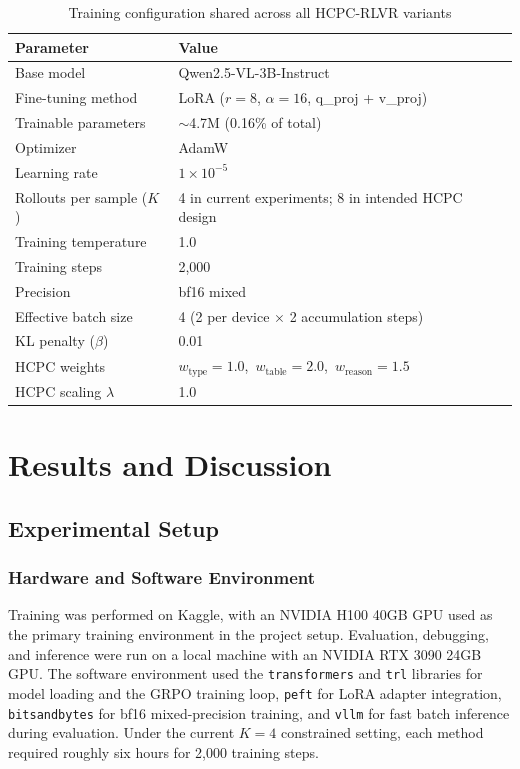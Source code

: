 \documentclass{iutbscthesis}
\begin{document}
\begin{table}[H]
    \centering
    \begin{tabular}{ll}
        \toprule
        Parameter & Value \\
        \midrule
        Base model & Qwen2.5-VL-3B-Instruct \\
        Fine-tuning method & LoRA ($r=8$, $\alpha=16$, q\_proj + v\_proj) \\
        Trainable parameters & $\sim$4.7M (0.16\% of total) \\
        Optimizer & AdamW \\
        Learning rate & $1 \times 10^{-5}$ \\
        Rollouts per sample ($K$) & 4 in current experiments; 8 in intended HCPC design \\
        Training temperature & 1.0 \\
        Training steps & 2,000 \\
        Precision & bf16 mixed \\
        Effective batch size & 4 (2 per device $\times$ 2 accumulation steps) \\
        KL penalty ($\beta$) & 0.01 \\
        HCPC weights & $w_{\text{type}}=1.0$,\ $w_{\text{table}}=2.0$,\ $w_{\text{reason}}=1.5$ \\
        HCPC scaling $\lambda$ & 1.0 \\
        \bottomrule
    \end{tabular}
    \caption{Training configuration shared across all HCPC-RLVR variants}
    \label{tab:training_config}
\end{table}


\chapter{Results and Discussion} \label{chapter:results}

\section{Experimental Setup}

\subsection{Hardware and Software Environment}

Training was performed on Kaggle, with an NVIDIA H100 40GB GPU used as the primary training environment in the project setup. Evaluation, debugging, and inference were run on a local machine with an NVIDIA RTX 3090 24GB GPU. The software environment used the \texttt{transformers} and \texttt{trl} libraries for model loading and the GRPO training loop, \texttt{peft} for LoRA adapter integration, \texttt{bitsandbytes} for bf16 mixed-precision training, and \texttt{vllm} for fast batch inference during evaluation. Under the current $K=4$ constrained setting, each method required roughly six hours for 2,000 training steps.
\end{document}
